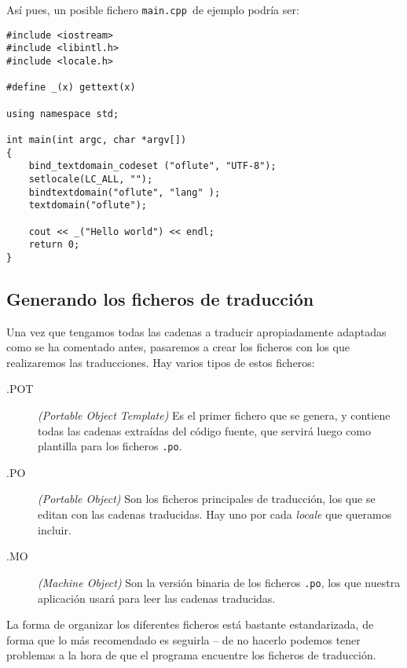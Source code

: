 \medskip

Así pues, un posible fichero \texttt{main.cpp }de ejemplo podría ser:

\begin{verbatim}
#include <iostream>
#include <libintl.h>
#include <locale.h>

#define _(x) gettext(x)

using namespace std;

int main(int argc, char *argv[])
{
    bind_textdomain_codeset ("oflute", "UTF-8");
    setlocale(LC_ALL, "");
    bindtextdomain("oflute", "lang" );
    textdomain("oflute");

    cout << _("Hello world") << endl;
    return 0;
}

\end{verbatim}

\subsection{Generando los ficheros de traducción}

Una vez que tengamos todas las cadenas a traducir apropiadamente
adaptadas como se ha comentado antes, pasaremos a crear los ficheros
con los que realizaremos las traducciones. Hay varios tipos de estos
ficheros:

\begin{description}
\item[.POT] \textit{(Portable Object Template)} Es el primer fichero
  que se genera, y contiene todas las cadenas extraídas del código
  fuente, que servirá luego como plantilla para los ficheros
  \texttt{.po}.

\item[.PO] \textit{(Portable Object)} Son los ficheros principales de
  traducción, los que se editan con las cadenas traducidas. Hay uno
  por cada \textit{locale} que queramos incluir.

\item[.MO] \textit{(Machine Object)} Son la versión binaria de los
  ficheros \texttt{.po}, los que nuestra aplicación usará para leer
  las cadenas traducidas.
\end{description}

\medskip

La forma de organizar los diferentes ficheros está bastante
estandarizada, de forma que lo más recomendado es seguirla -- de no
hacerlo podemos tener problemas a la hora de que el programa encuentre
los ficheros de traducción.

